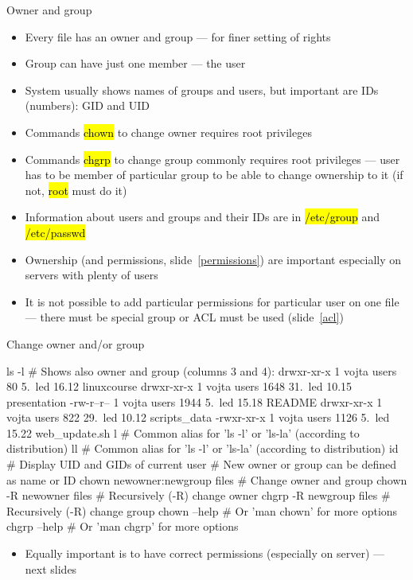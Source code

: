 \documentclass[compress, ucs, xelatex, 11pt, xcolor=svgnames,
  hyperref={
    bookmarks=true,
    unicode=true,
    colorlinks=true,
    pdftitle={Linux, command line and MetaCentrum},
    plainpages=false,
    pdfauthor={Vojtech Zeisek},
    pdfsubject={Course about use of Linux command line, writing shell scripts and using MetaCentrum of CESNET},
    pdfcreator={XeLaTeX},
    pdfkeywords={Linux, GNU, BASH, shell, command line, MetaCentrum},
    linkcolor=DarkRed,
    anchorcolor=DarkBlue,
    citecolor=Indigo,
    filecolor=NavyBlue,
    menucolor=DarkMagenta,
    urlcolor=DarkBlue,
    pdftex},
  url={hyphens, lowtilde} %
  ]{beamer}
\renewcommand{\texttt}[1]{\hl{\ttfamily #1}}
\begin{document}
\begin{frame}[fragile]{Owner and group}
  \begin{itemize}
    \item Every file has an owner and group --- for finer setting of rights
    \item Group can have just one member --- the user
    \item System usually shows names of groups and users, but important are IDs (numbers): GID and UID
    \item Commands \texttt{chown} to change owner requires root privileges
    \item Commands \texttt{chgrp} to change group commonly requires root privileges --- user has to be member of particular group to be able to change ownership to it (if not, \texttt{root} must do it)
    \item Information about users and groups and their IDs are in \texttt{/etc/group} and \texttt{/etc/passwd}
    \item Ownership (and permissions, slide~\ref{permissions}) are important especially on servers with plenty of users
    \item It is not possible to add particular permissions for particular user on one file --- there must be special group or ACL must be used (slide~\ref{acl})
  \end{itemize}
\end{frame}

\begin{frame}[fragile]{Change owner and/or group}
  \begin{bashcode}
    ls -l # Shows also owner and group (columns 3 and 4):
    drwxr-xr-x 1 vojta users    80  5. led 16.12 linuxcourse
    drwxr-xr-x 1 vojta users  1648 31. led 10.15 presentation
    -rw-r--r-- 1 vojta users  1944  5. led 15.18 README
    drwxr-xr-x 1 vojta users   822 29. led 10.12 scripts_data
    -rwxr-xr-x 1 vojta users  1126  5. led 15.22 web_update.sh
    l # Common alias for 'ls -l' or 'ls-la' (according to distribution)
    ll # Common alias for 'ls -l' or 'ls-la' (according to distribution)
    id # Display UID and GIDs of current user
    # New owner or group can be defined as name or ID
    chown newowner:newgroup files # Change owner and group
    chown -R newowner files # Recursively (-R) change owner
    chgrp -R newgroup files # Recursively (-R) change group
    chown --help # Or 'man chown' for more options
    chgrp --help # Or 'man chgrp' for more options
  \end{bashcode}
  \begin{itemize}
    \item Equally important is to have correct permissions (especially on server) --- next slides
  \end{itemize}
\end{frame}
\end{document}
